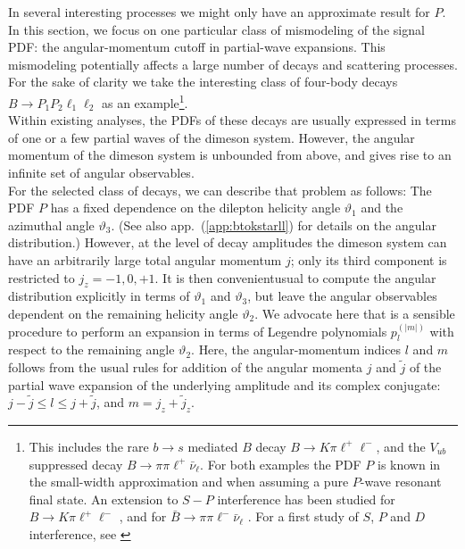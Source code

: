 \documentclass[aps,nofootinbib,preprintnumbers,prd,twocolumn]{revtex4-1}
\newcommand{\refapp}[1]{app.~(\ref{app:#1})}
\renewcommand{\theta}{\vartheta}
\newcommand{\add}[1]{\textcolor{green!85!black}{#1}}
\newcommand{\del}[1]{\textcolor{red!85!black}{#1}}
\begin{document}
In several interesting processes we might only have an approximate
result for $P$.  In this section, we focus on one particular class of
mismodeling of the signal PDF: the angular-momentum cutoff in partial-wave expansions. This mismodeling potentially affects a large number
of decays and scattering processes. For the sake of clarity we take
the interesting class of four-body decays $B\to P_1 P_2 \ell_1 \ell_2$
as an example\footnote{This includes the rare $b\to s$ mediated $B$ decay $B
  \to K\pi\ell^+\ell^-$, and the $V_{ub}$ suppressed decay $B\to
  \pi\pi\ell^+\bar\nu_\ell$. For both examples the PDF $P$ is known in
  the small-width approximation and when assuming a pure $P$-wave
  resonant final state. An extension to $S-P$ interference has been
  studied for $B\to K\pi\ell^+\ell^-$
  \cite{Blake:2012mb,Becirevic:2011bp}, and for $\bar{B}\to
  \pi\pi\ell^-\bar\nu_\ell$ \cite{Faller:2013dwa}. For a first study
  of $S$, $P$
  and $D$ interference, see \cite{Das:2014sra}
}.\\

Within existing analyses, the PDFs of these decays are usually expressed in terms of one or a few
partial waves of the dimeson system. However, the angular momentum of the dimeson system is unbounded
from above, and gives rise to an infinite set of angular observables.\\

For the selected class of decays, we can describe that problem as follows: The PDF $P$ has a fixed dependence on the dilepton
helicity angle $\theta_1$ and the azimuthal angle $\theta_3$. (See also \refapp{btokstarll} for details
on the angular distribution.) However, at the level of decay amplitudes the dimeson system can have an arbitrarily
large total angular momentum $j$; only its third component is restricted to $j_z = -1,0,+1$.
It is then \add{convenient}\del{usual} to compute the angular distribution explicitly in terms of $\theta_1$ and $\theta_3$, but leave
the angular observables dependent on the remaining helicity angle $\theta_2$.
We advocate here that is a sensible procedure to perform an expansion in terms of Legendre polynomials $p_{l}^{(|m|)}$
with respect to the remaining angle $\theta_2$. \add{Here, the angular-momentum indices $l$ and $m$ follows from the usual
rules for addition of the angular momenta $j$ and $\tilde{j}$ of the partial wave expansion of the underlying
amplitude and its complex conjugate: $j - \tilde{j} \leq l \leq j + \tilde{j}$, and $m = j_z + \tilde{j}_z$.}
\end{document}
